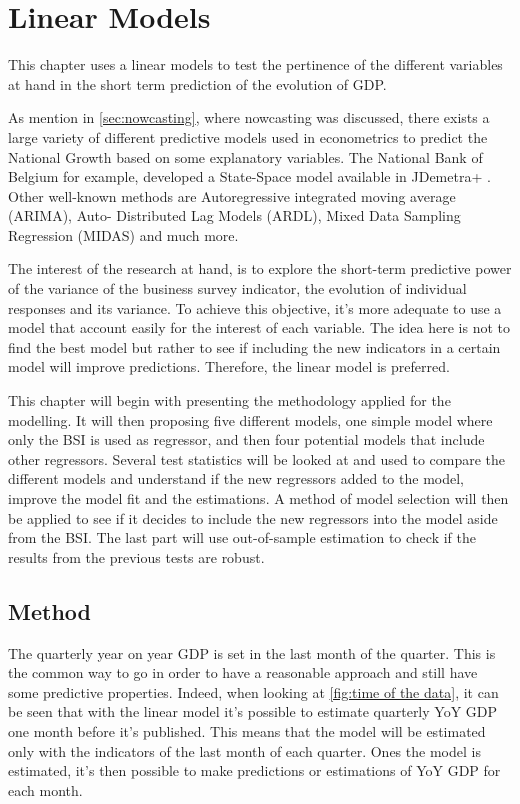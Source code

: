 \documentclass[12pt,a4paper,oneside]{book}
\begin{document}
\chapter{Linear Models}

This chapter uses a linear models to test the pertinence of the different variables at hand in the short term prediction of the evolution of GDP.

As mention in \autoref{sec:nowcasting}, where nowcasting was discussed, there exists a large variety of different predictive models used in econometrics to predict the National Growth based on some explanatory variables.
The National Bank of Belgium for example, developed a State-Space model available in JDemetra+ \citep{de_antonio_liedo_nowcasting_2014}. 
Other well-known methods are Autoregressive integrated moving average (ARIMA), Auto- Distributed Lag Models (ARDL), Mixed Data Sampling Regression (MIDAS) and much more.

The interest of the research at hand, is to explore the short-term predictive power of the variance of the business survey indicator, the evolution of individual responses and its variance.
To achieve this objective, it's more adequate to use a model that account easily for the interest of each variable. The idea here is not to find the best model but rather to see if including the new indicators in a certain model will improve predictions.
Therefore, the linear model is preferred.

This chapter will begin with presenting the methodology applied for the modelling.
It will then proposing five different models, one simple model where only the BSI is used as regressor, and then four potential models that include other regressors.
Several test statistics will be looked at and used to compare the different models and understand if the new regressors added to the model, improve the model fit and the estimations.
A method of model selection will then be applied to see if it decides to include the new regressors into the model aside from the BSI.
The last part will use out-of-sample estimation to check if the results from the previous tests are robust.

\section{Method}

The quarterly year on year GDP is set in the last month of the quarter. This is the common way to go in order to have a reasonable approach and still have some predictive properties.
Indeed, when looking at \autoref{fig:time of the data}, it can be seen that with the linear model it's possible to estimate quarterly YoY GDP one month before it's published. 
This means that the model will be estimated only with the indicators of the last month of each quarter. 
Ones the model is estimated, it's then possible to make predictions or estimations of YoY GDP for each month.
\end{document}
